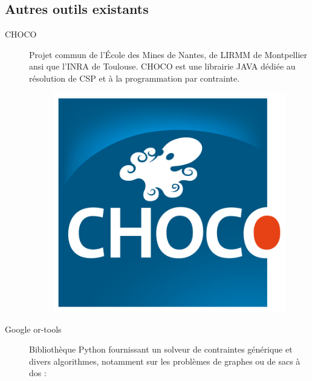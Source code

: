 \subsection{Autres outils existants}
\begin{description}
\item [CHOCO]  Projet commun  de l'École des Mines de Nantes, de \textsc{LIRMM} de Montpellier ansi que l'\textsc{INRA} de Toulouse. \textsc{CHOCO} est une librairie  \textsc{JAVA}  dédiée au résolution de \textsc{CSP} et à la programmation par contrainte. \cite{choco}
 \begin{figure}[h] %
  \center
\includegraphics[scale=0.50]{img/choco}
\end{figure} %
\item [Google or-tools]
 Bibliothèque Python fournissant un solveur de contraintes générique et divers algorithmes, notamment sur les problèmes de graphes ou de sacs à dos : \cite{ortools}


\end{description}
